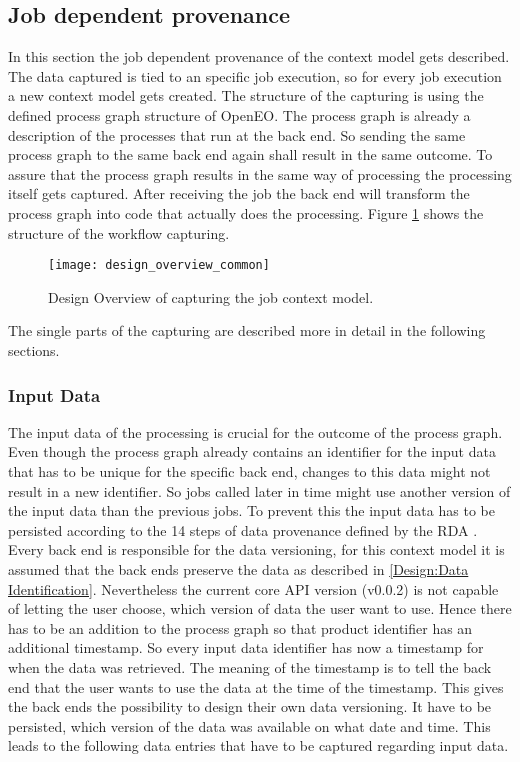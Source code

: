 \documentclass[draft,final]{vutinfth} %
\begin{document}
\subsection{Job dependent provenance}\label{Design:Job dependent provenance}
In this section the job dependent provenance of the context model gets described. The data captured is tied to an specific job execution, so for every job execution a new context model gets created. The structure of the capturing is using the defined process graph structure of OpenEO. The process graph is already a description of the processes that run at the back end. So sending the same process graph to the same back end again shall result in the same outcome. To assure that the process graph results in the same way of processing the processing itself gets captured. After receiving the job the back end will transform the process graph into code that actually does the processing. Figure \ref{fig:design_overview_common} shows the structure of the workflow capturing. 

\begin{figure}[h]
	\centering
	\texttt{[image: design\_overview\_common]}
	\caption{Design Overview of capturing the job context model.}
	\label{fig:design_overview_common} %
\end{figure}

The single parts of the capturing are described more in detail in the following sections. 

\subsubsection{Input Data}\label{Design:Input Data}
The input data of the processing is crucial for the outcome of the process graph. Even though the process graph already contains an identifier for the input data that has to be unique for the specific back end, changes to this data might not result in a new identifier. So jobs called later in time might use another version of the input data than the previous jobs. To prevent this the input data has to be persisted according to the 14 steps of data provenance defined by the RDA \cite{rauber2016identification}. Every back end is responsible for the data versioning, for this context model it is assumed that the back ends preserve the data as described in \ref{Design:Data Identification}. Nevertheless the current core API version (v0.0.2) is not capable of letting the user choose, which version of data the user want to use. Hence there has to be an addition to the process graph so that product identifier has an additional timestamp. So every input data identifier has now a timestamp for when the data was retrieved. The meaning of the timestamp is to tell the back end that the user wants to use the data at the time of the timestamp. This gives the back ends the possibility to design their own data versioning. It have to be persisted, which version of the data was available on what date and time. This leads to the following data entries that have to be captured regarding input data.
\end{document}
